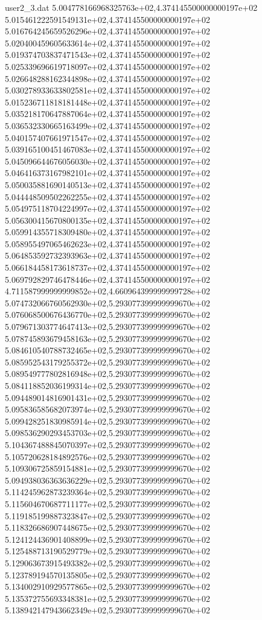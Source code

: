 \begin{filecontents}{user2_3.dat}
5.004778166968325763e+02,4.374145500000000197e+02
5.015461222591549131e+02,4.374145500000000197e+02
5.016764245659526296e+02,4.374145500000000197e+02
5.020400459605633614e+02,4.374145500000000197e+02
5.019374703837471543e+02,4.374145500000000197e+02
5.025339696619718097e+02,4.374145500000000197e+02
5.026648288162344898e+02,4.374145500000000197e+02
5.030278933633802581e+02,4.374145500000000197e+02
5.015236711818181448e+02,4.374145500000000197e+02
5.035218170647887064e+02,4.374145500000000197e+02
5.036532330665163499e+02,4.374145500000000197e+02
5.040157407661971547e+02,4.374145500000000197e+02
5.039165100451467083e+02,4.374145500000000197e+02
5.045096644676056030e+02,4.374145500000000197e+02
5.046416373167982101e+02,4.374145500000000197e+02
5.050035881690140513e+02,4.374145500000000197e+02
5.044448509502262255e+02,4.374145500000000197e+02
5.054975118704224997e+02,4.374145500000000197e+02
5.056300415670800135e+02,4.374145500000000197e+02
5.059914355718309480e+02,4.374145500000000197e+02
5.058955497065462623e+02,4.374145500000000197e+02
5.064853592732393963e+02,4.374145500000000197e+02
5.066184458173618737e+02,4.374145500000000197e+02
5.069792829746478446e+02,4.374145500000000197e+02
4.711587999999999852e+02,4.660964399999999728e+02
5.074732066760562930e+02,5.293077399999999670e+02
5.076068500676436770e+02,5.293077399999999670e+02
5.079671303774647413e+02,5.293077399999999670e+02
5.078745893679458163e+02,5.293077399999999670e+02
5.084610540788732465e+02,5.293077399999999670e+02
5.085952543179255372e+02,5.293077399999999670e+02
5.089549777802816948e+02,5.293077399999999670e+02
5.084118852036199314e+02,5.293077399999999670e+02
5.094489014816901431e+02,5.293077399999999670e+02
5.095836585682073974e+02,5.293077399999999670e+02
5.099428251830985914e+02,5.293077399999999670e+02
5.098536290293453703e+02,5.293077399999999670e+02
5.104367488845070397e+02,5.293077399999999670e+02
5.105720628184892576e+02,5.293077399999999670e+02
5.109306725859154881e+02,5.293077399999999670e+02
5.094938036363636229e+02,5.293077399999999670e+02
5.114245962873239364e+02,5.293077399999999670e+02
5.115604670687711177e+02,5.293077399999999670e+02
5.119185199887323847e+02,5.293077399999999670e+02
5.118326686907448675e+02,5.293077399999999670e+02
5.124124436901408899e+02,5.293077399999999670e+02
5.125488713190529779e+02,5.293077399999999670e+02
5.129063673915493382e+02,5.293077399999999670e+02
5.123789194570135805e+02,5.293077399999999670e+02
5.134002910929577865e+02,5.293077399999999670e+02
5.135372755693348381e+02,5.293077399999999670e+02
5.138942147943662349e+02,5.293077399999999670e+02

\end{filecontents}
